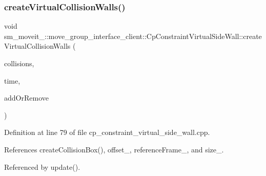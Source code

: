 \subsubsection{\texorpdfstring{create\+Virtual\+Collision\+Walls()}{createVirtualCollisionWalls()}}
{\footnotesize\ttfamily void sm\+\_\+moveit\+\_\+::move\+\_\+group\+\_\+interface\+\_\+client\+::\+Cp\+Constraint\+Virtual\+Side\+Wall\+::create\+Virtual\+Collision\+Walls (\begin{DoxyParamCaption}\item[{std\+::vector$<$ moveit\+\_\+msgs\+::\+Collision\+Object $>$ \&}]{collisions,  }\item[{const ros\+::\+Time \&}]{time,  }\item[{int}]{add\+Or\+Remove }\end{DoxyParamCaption})}



Definition at line 79 of file cp\+\_\+constraint\+\_\+virtual\+\_\+side\+\_\+wall.\+cpp.



References create\+Collision\+Box(), offset\+\_\+, reference\+Frame\+\_\+, and size\+\_\+.



Referenced by update().


